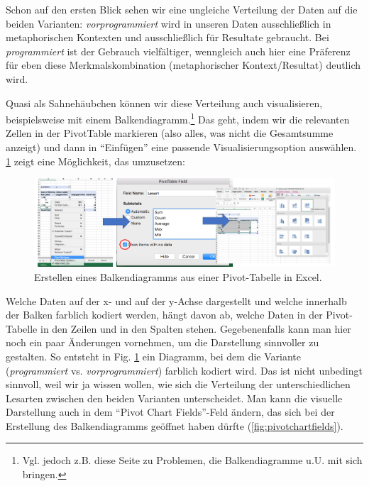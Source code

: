 \documentclass[]{article}
\let\rmarkdownfootnote\footnote%
\def\footnote{\protect\rmarkdownfootnote}
\begin{document}
Schon auf den ersten Blick sehen wir eine ungleiche Verteilung der Daten
auf die beiden Varianten: \emph{vorprogrammiert} wird in unseren Daten
ausschließlich in metaphorischen Kontexten und ausschließlich für
Resultate gebraucht. Bei \emph{programmiert} ist der Gebrauch
vielfältiger, wenngleich auch hier eine Präferenz für eben diese
Merkmalskombination (metaphorischer Kontext/Resultat) deutlich wird.

Quasi als Sahnehäubchen können wir diese Verteilung auch visualisieren,
beispielsweise mit einem Balkendiagramm.\footnote{Vgl. jedoch z.B. diese
  Seite zu Problemen, die Balkendiagramme u.U. mit sich bringen.} Das
geht, indem wir die relevanten Zellen in der PivotTable markieren (also
alles, was nicht die Gesamtsumme anzeigt) und dann in ``Einfügen'' eine
passende Visualisierungsoption auswählen. \ref{fig:excelvisualize} zeigt
eine Möglichkeit, das umzusetzen:

\begin{figure}
\includegraphics[width=6.66in]{docs/fig/excel_visualize} \caption{Erstellen eines Balkendiagramms aus einer Pivot-Tabelle in Excel.}\label{fig:excelvisualize}
\end{figure}

Welche Daten auf der x- und auf der y-Achse dargestellt und welche
innerhalb der Balken farblich kodiert werden, hängt davon ab, welche
Daten in der Pivot-Tabelle in den Zeilen und in den Spalten stehen.
Gegebenenfalls kann man hier noch ein paar Änderungen vornehmen, um die
Darstellung sinnvoller zu gestalten. So entsteht in Fig.
\ref{fig:excelvisualize} ein Diagramm, bei dem die Variante
(\emph{programmiert} vs. \emph{vorprogrammiert}) farblich kodiert wird.
Das ist nicht unbedingt sinnvoll, weil wir ja wissen wollen, wie sich
die Verteilung der unterschiedlichen Lesarten zwischen den beiden
Varianten unterscheidet. Man kann die visuelle Darstellung auch in dem
``Pivot Chart Fields''-Feld ändern, das sich bei der Erstellung des
Balkendiagramms geöffnet haben dürfte (\ref{fig:pivotchartfields}).
\end{document}
